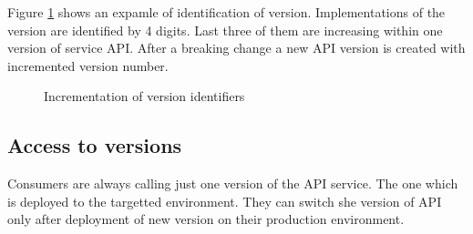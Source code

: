 Figure \ref{fig:version-identifying} shows an expamle of identification of version. Implementations of the version are identified by 4 digits. Last three of them are increasing within one version of service API. After a breaking change a new API version is created with incremented version number. 

\begin{figure}[htp] 
\caption{Incrementation of version identifiers}
\label{fig:version-identifying}
\end{figure} 


\subsection{Access to versions}
Consumers are always calling just one version of the API service. The one which is deployed to the targetted environment. They can switch she version of API only after deployment of new version on their production environment.





